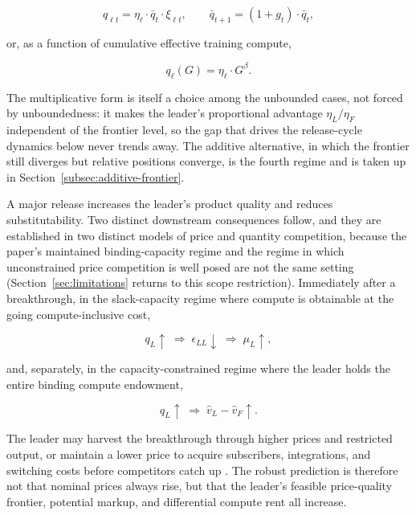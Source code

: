 \documentclass[11pt]{article}
\begin{document}
\begin{equation}q_{\ell t}=\eta_\ell\cdot\bar q_t\cdot\xi_{\ell t},\qquad \bar q_{t+1}=\left(1+g_t\right)\cdot\bar q_t,\end{equation}

or, as a function of cumulative effective training compute,

\begin{equation}q_\ell(G)=\eta_\ell\cdot G^\beta.\end{equation}

The multiplicative form is itself a choice among the unbounded cases, not forced by unboundedness: it makes the leader's proportional advantage $\eta_L/\eta_F$ independent of the frontier level, so the gap that drives the release-cycle dynamics below never trends away. The additive alternative, in which the frontier still diverges but relative positions converge, is the fourth regime and is taken up in Section~\ref{subsec:additive-frontier}.

A major release increases the leader's product quality and reduces substitutability. Two distinct downstream consequences follow, and they are established in two distinct models of price and quantity competition, because the paper's maintained binding-capacity regime and the regime in which unconstrained price competition is well posed are not the same setting (Section~\ref{sec:limitations} returns to this scope restriction). Immediately after a breakthrough, in the slack-capacity regime where compute is obtainable at the going compute-inclusive cost,

\begin{equation}q_L\uparrow\;\Longrightarrow\;\epsilon_{LL}\downarrow\;\Longrightarrow\;\mu_L\uparrow,\end{equation}

and, separately, in the capacity-constrained regime where the leader holds the entire binding compute endowment,

\begin{equation}q_L\uparrow\;\Longrightarrow\;\widehat v_L-\widehat v_F\uparrow.\end{equation}

The leader may harvest the breakthrough through higher prices and restricted output, or maintain a lower price to acquire subscribers, integrations, and switching costs before competitors catch up \citep{klemperer1987}. The robust prediction is therefore not that nominal prices always rise, but that the leader's feasible price-quality frontier, potential markup, and differential compute rent all increase.
\end{document}
